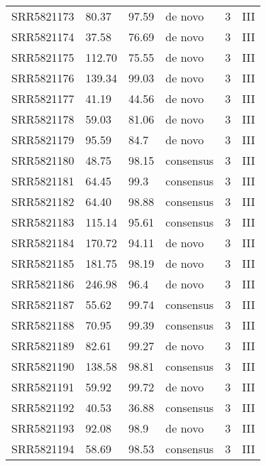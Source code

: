 \begin{scriptsize}
\begin{center}
\begin{longtable}{@{}llllll@{}}
SRR5821173 & 80.37         & 97.59       & de novo      & 3        & III      \\
SRR5821174 & 37.58         & 76.69       & de novo      & 3        & III      \\
SRR5821175 & 112.70        & 75.55       & de novo      & 3        & III      \\
SRR5821176 & 139.34        & 99.03       & de novo      & 3        & III      \\
SRR5821177 & 41.19         & 44.56       & de novo      & 3        & III      \\
SRR5821178 & 59.03         & 81.06       & de novo      & 3        & III      \\
SRR5821179 & 95.59         & 84.7        & de novo      & 3        & III      \\
SRR5821180 & 48.75         & 98.15       & consensus    & 3        & III      \\
SRR5821181 & 64.45         & 99.3        & consensus    & 3        & III      \\
SRR5821182 & 64.40         & 98.88       & consensus    & 3        & III      \\
SRR5821183 & 115.14        & 95.61       & consensus    & 3        & III      \\
SRR5821184 & 170.72        & 94.11       & de novo      & 3        & III      \\
SRR5821185 & 181.75        & 98.19       & de novo      & 3        & III      \\
SRR5821186 & 246.98        & 96.4        & de novo      & 3        & III      \\
SRR5821187 & 55.62         & 99.74       & consensus    & 3        & III      \\
SRR5821188 & 70.95         & 99.39       & consensus    & 3        & III      \\
SRR5821189 & 82.61         & 99.27       & de novo      & 3        & III      \\
SRR5821190 & 138.58        & 98.81       & consensus    & 3        & III      \\
SRR5821191 & 59.92         & 99.72       & de novo      & 3        & III      \\
SRR5821192 & 40.53         & 36.88       & consensus    & 3        & III      \\
SRR5821193 & 92.08         & 98.9        & de novo      & 3        & III      \\
SRR5821194 & 58.69         & 98.53       & consensus    & 3        & III      \\

\end{longtable}
\end{center}
\end{scriptsize}
